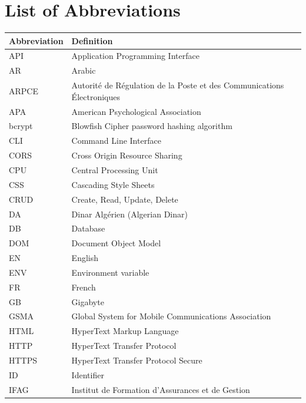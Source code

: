 
{}
\chapter*{List of Abbreviations}

\begin{longtable}{@{}p{3cm}p{12cm}@{}}
  \toprule
  \textbf{Abbreviation} & \textbf{Definition} \\
  \midrule
  \endhead
  API   & Application Programming Interface \\
  AR    & Arabic \\
  ARPCE & Autorité de Régulation de la Poste et des Communications Électroniques \\
  APA   & American Psychological Association \\
  bcrypt & Blowfish Cipher password hashing algorithm \\
  CLI   & Command Line Interface \\
  CORS  & Cross Origin Resource Sharing \\
  CPU   & Central Processing Unit \\
  CSS   & Cascading Style Sheets \\
  CRUD  & Create, Read, Update, Delete \\
  DA    & Dinar Algérien (Algerian Dinar) \\
  DB    & Database \\
  DOM   & Document Object Model \\
  EN    & English \\
  ENV   & Environment variable \\
  FR    & French \\
  GB    & Gigabyte \\
  GSMA  & Global System for Mobile Communications Association \\
  HTML  & HyperText Markup Language \\
  HTTP  & HyperText Transfer Protocol \\
  HTTPS & HyperText Transfer Protocol Secure \\
  ID    & Identifier \\
  IFAG  & Institut de Formation d'Assurances et de Gestion \\

\end{longtable}
